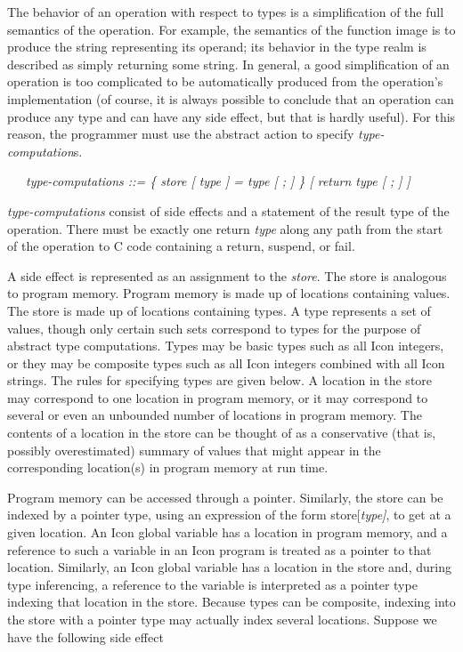 The behavior of an operation with respect to types is a simplification
of the full semantics of the operation. For example, the semantics of
the function image is to produce the string representing its operand;
its behavior in the type realm is described as simply returning some
string. In general, a good simplification of an operation is too
complicated to be automatically produced from the operation's
implementation (of course, it is always possible to conclude that an
operation can produce any type and can have any side effect, but that
is hardly useful). For this reason, the programmer must use the
abstract action to specify \textit{type-computation}s.

{\ttfamily\mdseries
\ \ \ \textit{type-computations ::= \{ store [ type ] = type [ ; ] \} [ return type [ ; ] ]}}


\textit{type-computations} consist of side effects and a statement of
the result type of the operation. There must be exactly one return
\textit{type} along any path from the start of the operation to C code
containing a return, suspend, or fail.

A side effect is represented as an assignment to the
\textit{store}. The store is analogous to program memory. Program
memory is made up of locations containing values. The store is made up
of locations containing types. A type represents a set of values,
though only certain such sets correspond to types for the purpose of
abstract type computations. Types may be basic types such as all Icon
integers, or they may be composite types such as all Icon integers
combined with all Icon strings. The rules for specifying types are
given below. A location in the store may correspond to one location in
program memory, or it may correspond to several or even an unbounded
number of locations in program memory.  The contents of a location in
the store can be thought of as a conservative (that is, possibly
overestimated) summary of values that might appear in the
corresponding location(s) in program memory at run time.

Program memory can be accessed through a pointer. Similarly, the store
can be indexed by a pointer type, using an expression of the form
store[\textit{type]}, to get at a given location. An Icon global
variable has a location in program memory, and a reference to such a
variable in an Icon program is treated as a pointer to that location.
Similarly, an Icon global variable has a location in the store and,
during type inferencing, a reference to the variable is interpreted as
a pointer type indexing that location in the store. Because types can
be composite, indexing into the store with a pointer type may actually
index several locations. Suppose we have the following side effect

